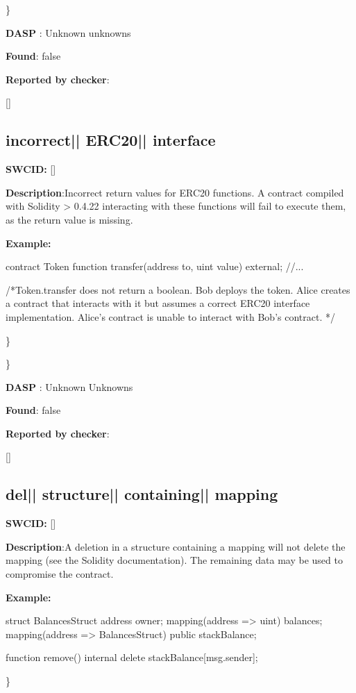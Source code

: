 \documentclass{article}
\begin{document}
\} 

\textbf{DASP} : Unknown unknowns

\textbf{Found}: false

\textbf{Reported by checker}: 
\begin{ffcode} 

[]
\end{ffcode} 
\subsection{incorrect{|\textunderscore| }ERC20{|\textunderscore| }interface} 
\textbf{SWC{\textunderscore }ID:} []

\textbf{Description}:Incorrect return values for ERC20 functions. A contract compiled with Solidity > 0.4.22 interacting with these functions will fail to execute them, as the return value is missing.


\textbf{Example:} 
\begin{ffcode} 

contract Token{
    function transfer(address to, uint value) external;
    //...
}

 /*Token.transfer does not return a boolean. Bob deploys the token. Alice creates a contract that interacts with it but assumes a correct ERC20 interface implementation. Alice's contract is unable to interact with Bob's contract. */ 

\end{ffcode} 
\} 

\} 

\textbf{DASP} : Unknown Unknowns

\textbf{Found}: false

\textbf{Reported by checker}: 
\begin{ffcode} 

[]
\end{ffcode} 
\subsection{del{|\textunderscore| }structure{|\textunderscore| }containing{|\textunderscore| }mapping} 
\textbf{SWC{\textunderscore }ID:} []

\textbf{Description}:A deletion in a structure containing a mapping will not delete the mapping (see the Solidity documentation). The remaining data may be used to compromise the contract.


\textbf{Example:} 
\begin{ffcode} 

struct BalancesStruct{
    address owner;
    mapping(address => uint) balances;
}
mapping(address => BalancesStruct) public stackBalance;

function remove() internal{
      delete stackBalance[msg.sender];
}

\end{ffcode} 
\} 
\end{document}

